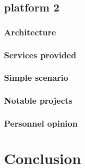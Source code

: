 \documentclass[a4paper,11pt]{report}
\begin{document}
  \subsection{platform 2} %
  
  \subsubsection{Architecture}
  
  \subsubsection{Services provided}
  
  \subsubsection{Simple scenario}
  
  \subsubsection{Notable projects}
  
  \subsubsection{Personnel opinion}
  
  
  
  
  \section{Conclusion}

  
%
%
\end{document}
